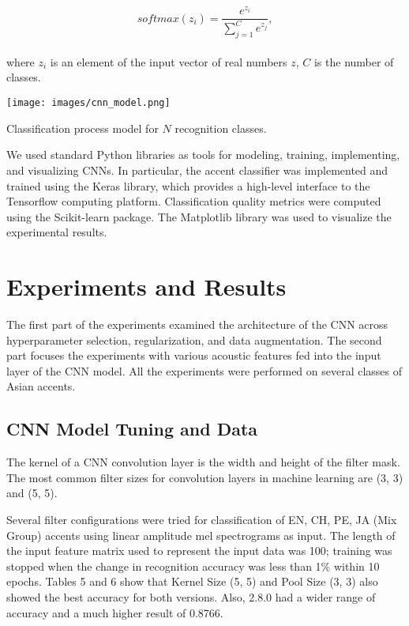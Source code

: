 \documentclass[ams]{U-AizuGT}
\begin{document}
\begin{equation}
softmax(z_i)=\frac{e^{z_i}}{\sum\nolimits_{j=1}^{C} e^{z_j}},
\end{equation}
\\
where $z_i$ is an element of the input vector of real numbers $z$, $C$ is the number of classes.

\begin{table}[h]
    \centering
    \texttt{[image: images/cnn\_model.png]}
    \caption{Classification process model for $N$ recognition classes.}
\end{table}

We used standard Python libraries as tools for modeling, training, implementing, and visualizing CNNs. In particular, the accent classifier was implemented and trained using the Keras library, which provides a high-level interface to the Tensorflow computing platform. Classification quality metrics were computed using the Scikit-learn package. The Matplotlib library was used to visualize the experimental results.

\section{Experiments and Results}
The first part of the experiments examined the architecture of the CNN across hyperparameter selection, regularization, and data augmentation. The second part focuses the experiments with various acoustic features fed into the input layer of the CNN model. All the experiments were performed on several classes of Asian accents.
\subsection{CNN Model Tuning and Data }
The kernel of a CNN convolution layer is the width and height of the filter mask. The most common filter sizes for convolution layers in machine learning are (3, 3) and (5, 5).\par
Several filter configurations were tried for classification of {EN, CH, PE, JA} (Mix Group) accents using linear amplitude mel spectrograms as input. The length of the input feature matrix used to represent the input data was 100; training was stopped when the change in recognition accuracy was less than 1\% within 10 epochs. Tables 5 and 6 show that Kernel Size (5, 5) and Pool Size (3, 3) also showed the best accuracy for both versions. Also, 2.8.0 had a wider range of accuracy and a much higher result of 0.8766.
\end{document}

